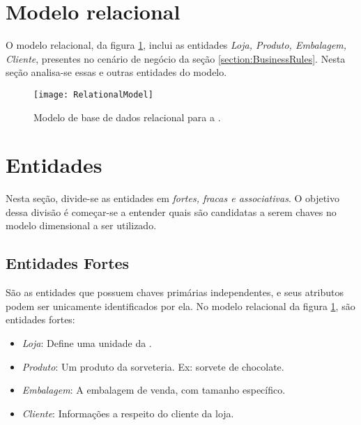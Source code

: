 \section{Modelo relacional}

O modelo relacional, da figura \ref{figure:RelationalModel}, inclui as entidades \emph{Loja, Produto, Embalagem, Cliente}, presentes no cenário de negócio da seção \ref{section:BusinessRules}. Nesta seção analisa-se essas e outras entidades do modelo.

\begin{landscape}
\begin{figure}[ht]
\begin{centering}
    \texttt{[image: RelationalModel]}
    \caption{Modelo de base de dados relacional para a \storeFullName{}.}
    \label{figure:RelationalModel}
\end{centering}
\end{figure}
\end{landscape}

\section {Entidades}

Nesta seção, divide-se as entidades em \emph{fortes, fracas e associativas}. O objetivo dessa divisão é começar-se a entender quais são candidatas a serem chaves no modelo dimensional a ser utilizado.

\subsection{Entidades Fortes}
São as entidades que possuem chaves primárias independentes, e seus atributos podem ser unicamente identificados por ela. No modelo relacional da figura \ref{figure:RelationalModel}, são entidades fortes:

\begin{itemize}
\item \emph{Loja}: Define uma unidade da \storeFullName{}.
\item \emph{Produto}: Um produto da sorveteria. Ex: sorvete de chocolate.
\item \emph{Embalagem}: A embalagem de venda, com tamanho específico.
\item \emph{Cliente}: Informações a respeito do cliente da loja.
\end{itemize}

